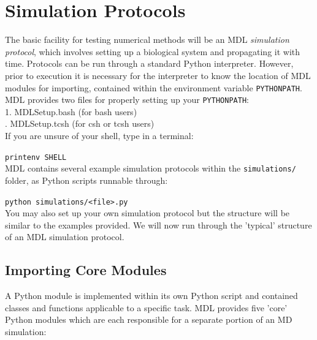 \documentclass[11pt]{report}
\begin{document}
\chapter{Simulation Protocols}

The basic facility for testing numerical methods will be an MDL
{\it simulation protocol}, which involves setting up a biological
system and propagating it with time.  Protocols can be run through
a standard Python interpreter.  However, prior to execution it is 
necessary for the interpreter to know the location of MDL modules
for importing, contained within the environment variable 
\texttt{PYTHONPATH}.  MDL provides two files for properly
setting up your \texttt{PYTHONPATH}: \\

1. MDLSetup.bash (for bash users) \\
. MDLSetup.tcsh (for csh or tcsh users) \\

If you are unsure of your shell, type in a terminal:

\texttt{printenv SHELL}\\

MDL contains several example simulation protocols within
the \texttt{simulations/} folder, as Python scripts runnable
through:

\texttt{python simulations/<file>.py}\\

You may also set up your own simulation protocol but the structure
will be similar to the examples provided.  We will now run through
the 'typical' structure of an MDL simulation protocol.

\section{Importing Core Modules}

A Python module is implemented within its own Python script
and contained classes and functions applicable to a specific
task.  MDL provides five 'core' Python modules which are each
responsible for a separate portion of an MD simulation:
\end{document}
